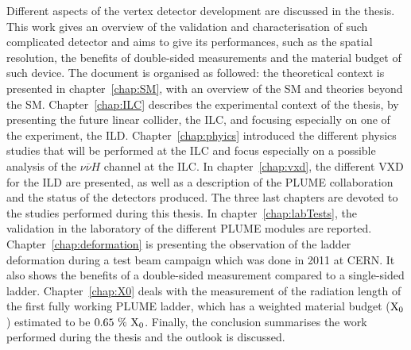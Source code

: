   Different aspects of the vertex detector development are discussed in the thesis.
  This work gives an overview of the validation and characterisation of such complicated detector and aims to give its performances, such as the spatial resolution, the benefits of double-sided measurements and the material budget of such device.
  The document is organised as followed:
  the theoretical context is presented in chapter~\ref{chap:SM}, with an overview of the \gls{SM} and theories beyond the \gls{SM}.
  Chapter~\ref{chap:ILC} describes the experimental context of the thesis, by presenting the future linear collider, the \gls{ILC}, and focusing especially on one of the experiment, the \gls{ILD}.
  Chapter~\ref{chap:phyics} introduced the different physics studies that will be performed at the \gls{ILC} and focus especially on a possible analysis of the $\nu\overline{\nu}H$ channel at the \gls{ILC}.
  In chapter~\ref{chap:vxd}, the different \gls{VXD} for the \gls{ILD} are presented, as well as a description of the \gls{PLUME} collaboration and the status of the detectors produced.
  The three last chapters are devoted to the studies performed during this thesis.
  In chapter~\ref{chap:labTests}, the validation in the laboratory of the different \gls{PLUME} modules are reported.
  Chapter~\ref{chap:deformation} is presenting the observation of the ladder deformation during a test beam campaign which was done in 2011 at \gls{CERN}. 
  It also shows the benefits of a double-sided measurement compared to a single-sided ladder.
  Chapter~\ref{chap:X0} deals with the measurement of the radiation length of the first fully working \gls{PLUME} ladder, which has a weighted material budget ($\rm{X_0}$) estimated to be $0.65~\%~\rm{X_0}$.
  Finally, the conclusion summarises the work performed during the thesis and the outlook is discussed.
